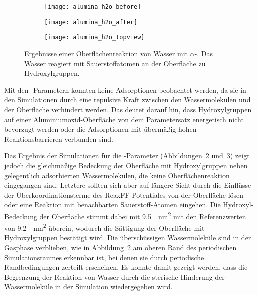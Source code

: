 \begin{figure}
  \captionsetup[subfigure]{singlelinecheck=false}
  \def\subfigwidth{0.32\textwidth}
  \begin{subfigure}[t]{\subfigwidth}
    \texttt{[image: alumina\_h2o\_before]}
    \label{fig:wateraluminasurface-a}
  \end{subfigure}
  \hfill
  \begin{subfigure}[t]{\subfigwidth}
    \texttt{[image: alumina\_h2o\_after]}
    \label{fig:wateraluminasurface-b}
  \end{subfigure}
  \hfill
  \begin{subfigure}[t]{\subfigwidth}
    \texttt{[image: alumina\_h2o\_topview]}
    \label{fig:wateraluminasurface-c}
  \end{subfigure}
  \caption[Oberflächenreaktion von Wasser mit $\alpha$-]{Ergebnisse einer Oberflächenreaktion von Wasser mit $\alpha$-.
    Das Wasser reagiert mit Sauerstoffatomen an der Oberfläche zu Hydroxylgruppen.
  }
  \label{fig:wateraluminasurface}
\end{figure}

Mit den -Parametern konnten keine Adsorptionen beobachtet werden, da sie in den Simulationen durch eine repulsive Kraft zwischen den Wassermolekülen und der Oberfläche verhindert werden.
Das deutet darauf hin, dass Hydroxylgruppen auf einer Aluminiumoxid-Oberfläche von dem Parametersatz energetisch nicht bevorzugt werden oder die Adsorptionen mit übermäßig hohen Reaktionsbarrieren verbunden sind.

Das Ergebnis der Simulationen für die -Parameter (Abbildungen~\ref{fig:wateraluminasurface-b} und~\ref{fig:wateraluminasurface-c}) zeigt jedoch die gleichmäßige Bedeckung der Oberfläche mit Hydroxylgruppen neben gelegentlich adsorbierten Wassermolekülen, die keine Oberflächenreaktion eingegangen sind.
Letztere sollten sich aber auf längere Sicht durch die Einflüsse der Überkoordinationsterme des ReaxFF-Potentiales von der Oberfläche lösen oder eine Reaktion mit benachbarten Sauerstoff-Atomen eingehen.
Die Hydroxyl-Bedeckung der Oberfläche stimmt dabei mit \SI{9.5}{\per\square\nano\meter} mit den Referenzwerten von \SI{9.2}{\per\square\nano\meter} überein, wodurch die Sättigung der Oberfläche mit Hydroxylgruppen bestätigt wird.
Die überschüssigen Wassermoleküle sind in der Gasphase verblieben, wie in Abbildung~\ref{fig:wateraluminasurface-b} am oberen Rand des periodischen Simulationsraumes erkennbar ist, bei denen sie durch periodische Randbedingungen zerteilt erscheinen.
Es konnte damit gezeigt werden, dass die Begrenzung der Reaktion von Wasser durch die sterische Hinderung der Wassermoleküle in der Simulation wiedergegeben wird.

